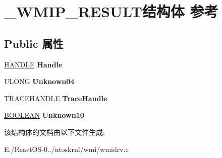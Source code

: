 \hypertarget{struct___w_m_i_p___r_e_s_u_l_t}{}\section{\+\_\+\+W\+M\+I\+P\+\_\+\+R\+E\+S\+U\+L\+T结构体 参考}
\label{struct___w_m_i_p___r_e_s_u_l_t}
\subsection*{Public 属性}
\begin{DoxyCompactItemize}
\item 
\mbox{\label{struct___w_m_i_p___r_e_s_u_l_t_aa0756ae0629b29f50b8a2ad30bdf222b}} 
\hyperlink{interfacevoid}{H\+A\+N\+D\+LE} {\bfseries Handle}
\item 
\mbox{\label{struct___w_m_i_p___r_e_s_u_l_t_a37c6778400be4c6bab6f749712deb215}} 
U\+L\+O\+NG {\bfseries Unknown04}
\item 
\mbox{\label{struct___w_m_i_p___r_e_s_u_l_t_a962d0146bc28e6b5091090432af70f3b}} 
T\+R\+A\+C\+E\+H\+A\+N\+D\+LE {\bfseries Trace\+Handle}
\item 
\mbox{\label{struct___w_m_i_p___r_e_s_u_l_t_a6f3f6541db4583a88ba8f70f5c9de54d}} 
\hyperlink{_processor_bind_8h_a112e3146cb38b6ee95e64d85842e380a}{B\+O\+O\+L\+E\+AN} {\bfseries Unknown10}
\end{DoxyCompactItemize}


该结构体的文档由以下文件生成\+:\begin{DoxyCompactItemize}
\item 
E\+:/\+React\+O\+S-\/0../ntoskrnl/wmi/wmidrv.\+c\end{DoxyCompactItemize}
